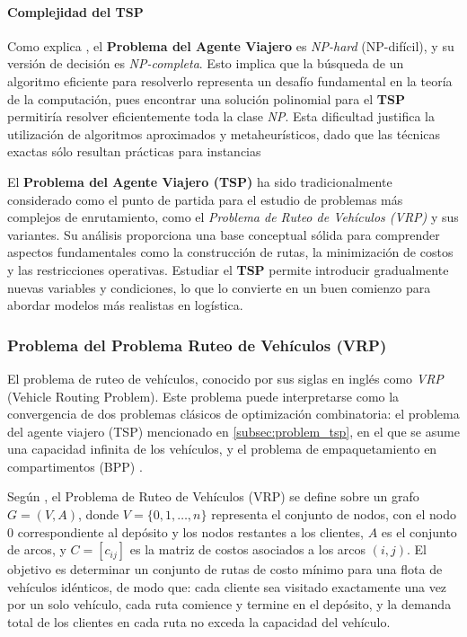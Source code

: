 \documentclass[12pt,titlepage,twoside,openright]{book}
\begin{document}
\paragraph{Complejidad del TSP}

Como explica \cite{papadimitriou1998}, el \textbf{Problema del Agente Viajero} es \textit{NP-hard} (NP-difícil), y su versión de decisión es \textit{NP-completa}. Esto implica que la búsqueda de un algoritmo eficiente para resolverlo representa un desafío fundamental en la teoría de la computación, pues encontrar una solución polinomial para el \textbf{TSP} permitiría resolver eficientemente toda la clase \textit{NP}. Esta dificultad justifica la utilización de algoritmos aproximados y metaheurísticos, dado que las técnicas exactas sólo resultan prácticas para instancias

El \textbf{Problema del Agente Viajero (TSP)} ha sido tradicionalmente considerado como el punto de partida para el estudio de problemas más complejos de enrutamiento, como el \textit{Problema de Ruteo de Vehículos (VRP)} y sus variantes. Su análisis proporciona una base conceptual sólida para comprender aspectos fundamentales como la construcción de rutas, la minimización de costos y las restricciones operativas. Estudiar el \textbf{TSP} permite introducir gradualmente nuevas variables y condiciones, lo que lo convierte en un buen comienzo para abordar modelos más realistas en logística.

\subsubsection{Problema del Problema Ruteo de Vehículos (VRP)}
\label{subsec:problem_vrp}
El problema de ruteo de vehículos, conocido por sus siglas en inglés como \textit{VRP} (Vehicle Routing Problem). Este problema puede interpretarse como la convergencia de dos problemas clásicos de optimización combinatoria: el problema del agente viajero (TSP) mencionado en \autoref{subsec:problem_tsp}, en el que se asume una capacidad infinita de los vehículos, y el problema de empaquetamiento en compartimentos (BPP) \cite{daza2009}.

Según \citep{toth2014}, el Problema de Ruteo de Vehículos (VRP) se define sobre un grafo $G = (V, A)$, donde $V = \{0, 1, \dots, n\}$ representa el conjunto de nodos, con el nodo $0$ correspondiente al depósito y los nodos restantes a los clientes, $A$ es el conjunto de arcos, y $C = [c_{ij}]$ es la matriz de costos asociados a los arcos $(i, j)$. El objetivo es determinar un conjunto de rutas de costo mínimo para una flota de vehículos idénticos, de modo que: cada cliente sea visitado exactamente una vez por un solo vehículo, cada ruta comience y termine en el depósito, y la demanda total de los clientes en cada ruta no exceda la capacidad del vehículo.
\end{document}
